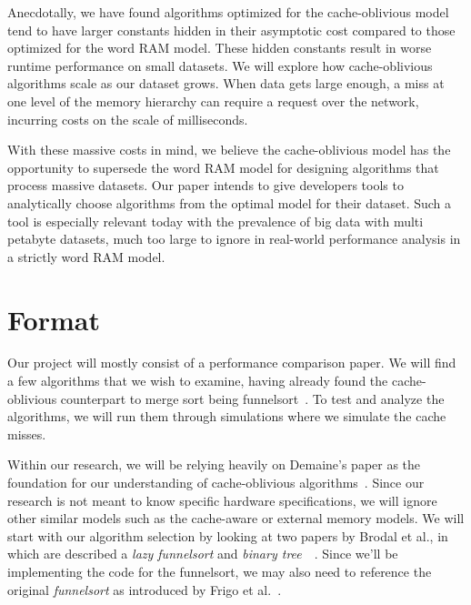 \documentclass[11pt,letterpaper]{article}
\begin{document}
Anecdotally, we have found algorithms optimized for the cache-oblivious model tend to have larger constants hidden in their asymptotic cost compared to those optimized for the word RAM model. These hidden constants result in worse runtime performance on small datasets. We will explore how cache-oblivious algorithms scale as our dataset grows. When data gets large enough, a miss at one level of the memory hierarchy can require a request over the network, incurring costs on the scale of milliseconds.

With these massive costs in mind, we believe the cache-oblivious model has the opportunity to supersede the word RAM model for designing algorithms that process massive datasets. Our paper intends to give developers tools to analytically choose algorithms from the optimal model for their dataset. Such a tool is especially relevant today with the prevalence of big data with multi petabyte datasets, much too large to ignore in real-world performance analysis in a strictly word RAM model. 


\section{Format}
Our project will mostly consist of a performance comparison paper. We will find a few algorithms that we wish to examine, having already found the cache-oblivious counterpart to merge sort being funnelsort~\cite{demaine}. To test and analyze the algorithms, we will run them through simulations where we simulate the cache misses. 

Within our research, we will be relying heavily on Demaine's paper as the foundation for our understanding of cache-oblivious algorithms~\cite{demaine}. Since our research is not meant to know specific hardware specifications, we will ignore other similar models such as the cache-aware or external memory models. We will start with our algorithm selection by looking at two papers by Brodal et al., in which are described a \emph{lazy funnelsort} and \emph{binary tree}~\cite{brodal_bst}~\cite{brodal_lazyfunnel}. Since we'll be implementing the code for the funnelsort, we may also need to reference the original \emph{funnelsort} as introduced by Frigo et al.~\cite{frigo}.
\end{document}
